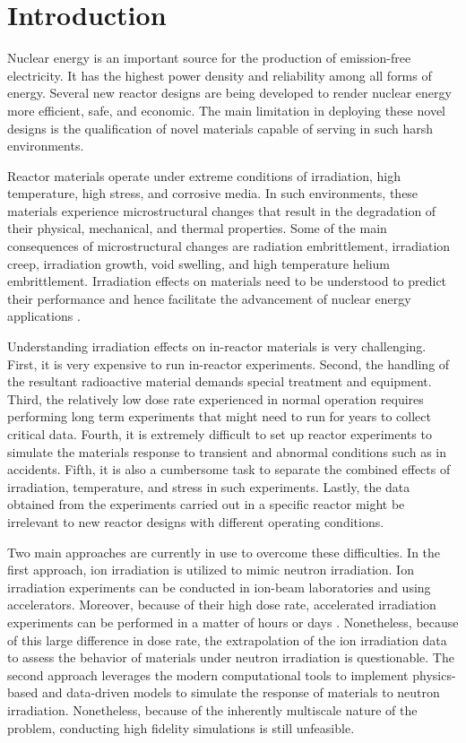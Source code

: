 \documentclass[utf8]{frontiersSCNS} %
\begin{document}
\section{Introduction}

Nuclear energy is an important source for the production of emission-free electricity. It has the highest power density and reliability among all forms of energy. Several new reactor designs are being developed to render nuclear energy more efficient, safe, and economic. The main limitation in deploying these novel designs is the qualification of novel materials capable of serving in such harsh environments.

Reactor materials operate under extreme conditions of irradiation, high temperature, high stress, and corrosive media. In such environments, these materials experience microstructural changes that result in the degradation of their physical, mechanical, and thermal properties. Some of the main consequences of microstructural changes are radiation embrittlement, irradiation creep, irradiation growth, void swelling, and high temperature helium embrittlement. Irradiation effects on materials need to be understood to predict their performance and hence facilitate the advancement of nuclear energy applications \citep{Vanderlaan2012,English2003,ryabikovskaya2021,yingling2021}.

Understanding irradiation effects on in-reactor materials is very challenging. First, it is very expensive to run in-reactor experiments. Second, the handling of the resultant radioactive material demands special treatment and equipment. Third, the relatively low dose rate experienced in normal operation requires performing long term experiments that might need to run for years to collect critical data. Fourth, it is extremely difficult to set up reactor experiments to simulate the materials response to transient and abnormal conditions such as in accidents. Fifth, it is also a cumbersome task to separate the combined effects of irradiation, temperature, and stress in such experiments. Lastly, the data obtained from the experiments carried out in a specific reactor might be irrelevant to new reactor designs with different operating conditions.

Two main approaches are currently in use to overcome these difficulties. In the first approach, ion irradiation is utilized to mimic neutron irradiation. Ion irradiation experiments can be conducted in ion-beam laboratories and using accelerators. Moreover, because of their high dose rate, accelerated irradiation experiments can be performed in a matter of hours or days \cite{shao2017, sun2017, krasheninnikov2010, was2014, zhang2018}. Nonetheless, because of this large difference in dose rate, the extrapolation of the ion irradiation data to assess the behavior of materials under neutron irradiation is questionable. The second approach leverages the modern computational tools to implement physics-based and data-driven models to simulate the response of materials to neutron irradiation. Nonetheless, because of the inherently multiscale nature of the problem, conducting high fidelity simulations is still unfeasible. 
\end{document}
